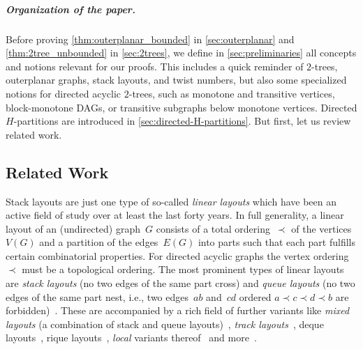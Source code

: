 \documentclass{theoretics}
\begin{document}
\subparagraph{Organization of the paper.}
Before proving \cref{thm:outerplanar_bounded} in \cref{sec:outerplanar} and \cref{thm:2tree_unbounded} in \cref{sec:2trees}, we define in \cref{sec:preliminaries} all concepts and notions relevant for our proofs.
This includes a quick reminder of $2$-trees, outerplanar graphs, stack layouts, and twist numbers, but also some specialized notions for directed acyclic $2$-trees, such as monotone and transitive vertices, block-monotone DAGs, or transitive subgraphs below monotone vertices.
Directed $H$-partitions are introduced in \cref{sec:directed-H-partitions}.
But first, let us review related work.

\subsection{Related Work}
\label{sec:related_work}

Stack layouts are just one type of so-called \emph{linear layouts} which have been an active field of study over at least the last forty years.
In full generality, a linear layout of an (undirected) graph~$G$ consists of a total ordering~$\prec$ of the vertices~$V(G)$ and a partition of the edges~$E(G)$ into parts such that each part fulfills certain combinatorial properties.
For directed acyclic graphs the vertex ordering~$\prec$ must be a topological ordering.
The most prominent types of linear layouts are \emph{stack layouts} (no two edges of the same part cross) and \emph{queue layouts} (no two edges of the same part nest, i.e., two edges~$ab$ and~$cd$ ordered $a \prec c \prec d \prec b$ are forbidden)~\cite{Heath1992_Queues,Heath1992_Comparing,Dujmovic2020_PlanarGraphsBoundedQueueNumber}.
These are accompanied by a rich field of further variants like \emph{mixed layouts} (a combination of stack and queue layouts)~\cite{Heath1992_Queues,Pupyrev2017_MixedLayoutPlanar,Angelini2022_MixedLayouts2Trees,Alam2022_MixedPageNumber,deCol2019_MixedLinearLayours,Foerster2023_BipartiteLinearLayouts}, \emph{track layouts}~\cite{Dujmovic2005_TrackLayouts,Bannister2019_TrackLayouts,Pupyrev2020_TrackNumber}, deque layouts~\cite{Auer2011_QueueDequeGraphs,Bekos2023_ComputeLinearLayouts,Bekos2023_DequeRiqueComplete}, rique layouts~\cite{Bekos2023_RiqueNumber,Bekos2023_ComputeLinearLayouts,Bekos2023_DequeRiqueComplete}, \emph{local} variants thereof~\cite{Merker2019_LocalStack,Merker2020_LocalQueue,Merker2021_LocalComplete,Angelini2022_MixedLayouts2Trees} and more~\cite{Dujmovic2004_LinearLayouts,Alam2021_DispersableBookEmbeddings}.
\end{document}
